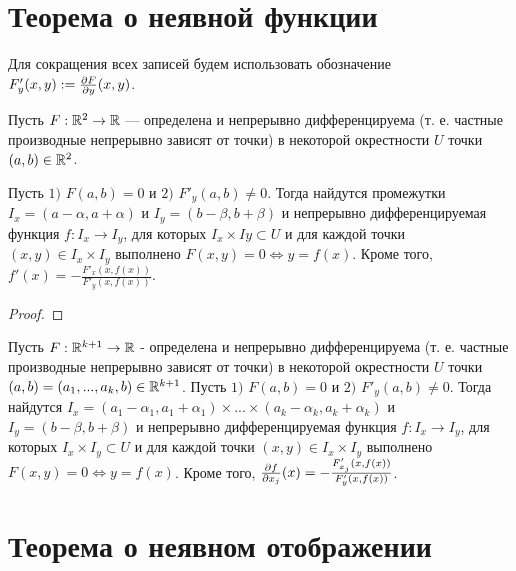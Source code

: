     \section{Теорема о неявной функции}
    
    Для сокращения всех записей будем использовать обозначение $F'_y(x, y) := \frac{\partial F}{\partial y}(x, y)$.
    
    \begin{theorem}
    	Пусть $F : \mathbb R^2 \rightarrow \mathbb R$ — определена и непрерывно дифференцируема (т. е. частные производные непрерывно зависят от точки) в некоторой окрестности $U$ точки $(a, b) \in \mathbb R^2$.
    	
    	Пусть $1)$ $F(a, b) = 0$ и $2)$ $F'_y(a, b) \neq 0$. Тогда найдутся промежутки $I_x = (a - \alpha, a + \alpha)$ и $I_y = (b - \beta, b + \beta)$ и непрерывно дифференцируемая функция $f : I_x \rightarrow I_y$, для которых $I_x \times Iy \subset U$ и для каждой точки $(x, y) \in I_x \times I_y$ выполнено $F(x, y) = 0 \Leftrightarrow y = f(x)$. Кроме того, $f'(x) = -\frac{F'_x(x, f(x))}{F'_y(x, f(x))}.$
    \end{theorem}
    
    \begin{proof}
    \end{proof}
    
    \begin{theorem}
    	Пусть $F : \mathbb R^{k + 1} \rightarrow \mathbb R$ - определена и непрерывно дифференцируема (т. е. частные производные непрерывно зависят от точки) в некоторой окрестности $U$ точки $(a, b) = (a_1, ..., a_k, b) \in \mathbb R^{k + 1}$. Пусть $1)$ $F(a, b) = 0$ и $2)$ $F'_y(a, b) \neq 0$. Тогда найдутся $I_x = (a_1 - \alpha_1, a_1 + \alpha_1) \times ... \times (a_k - \alpha_k, a_k + \alpha_k)$ и $I_y = (b - \beta, b + \beta)$ и непрерывно дифференцируемая функция $f : I_x \rightarrow I_y$, для которых $I_x \times I_y \subset U$ и для каждой точки $(x, y) \in I_x \times I_y$ выполнено $F(x, y) = 0 \Leftrightarrow y = f(x)$. Кроме того, $\frac{\partial f}{\partial x_j}(x) = -\frac{F'_{x_j}(x, f(x))}{F'_y(x, f(x))}$.
    \end{theorem}
    
    \section{Теорема о неявном отображении}
    
